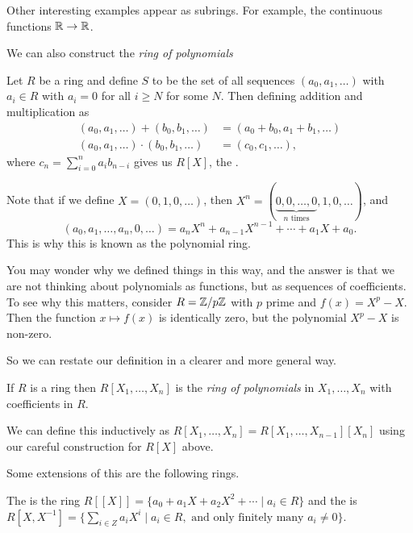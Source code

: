 \documentclass[a4paper]{scrartcl}
\begin{document}
 Other interesting examples appear as subrings. For example, the continuous functions $\mathbb{R} \rightarrow \mathbb{R}$.

 We can also construct the \emph{ring of polynomials} 

\begin{definition}
	Let $R$ be a ring and define $S$ to be  the set of all sequences $(a_0, a_1, \dots)$ with $a_i \in R$ with $a_i = 0$ for all $i \geq N$ for some $N$. Then defining addition and multiplication as
		 \begin{align*}
			 (a_0, a_1, \dots) + (b_0, b_1, \dots) &= (a_0 + b_0, a_1 + b_1, \dots) \\
			 (a_0, a_1, \dots) \cdot (b_0, b_1, \dots) &= (c_0, c_1, \dots),
		 \end{align*}
		 where $c_n = \sum_{i = 0}^n a_i b_{n - i}$ gives us $R[X]$, the .
\end{definition}

Note that if we define $X = (0, 1, 0, \dots)$, then $X^n = (\underbrace{0, 0, \dots, 0}_{\text{$n$ times}}, 1, 0, \dots)$, and
$$
(a_0, a_1, \dots, a_n, 0, \dots) = a_n X^n + a_{n - 1}X^{n - 1} + \cdots + a_1 X + a_0.
$$
This is why this is known as the polynomial ring.

You may wonder why we defined things in this way, and the answer is that we are not thinking about polynomials as functions, but as sequences of coefficients. To see why this matters, consider $R = \mathbb{Z}/p\mathbb{Z}$ with $p$ prime and $f(x) = X^p - X$. Then the function $x \mapsto f(x)$ is identically zero, but the polynomial $X^p - X$ is non-zero.

So we can restate our definition in a clearer and more general way.

\begin{definition}
	If $R$ is a ring then $R[X_1, \dots, X_n]$ is the \emph{ring of polynomials} in $X_1, \dots, X_n$ with coefficients in $R$.
\end{definition}

\begin{remark}
We can define this inductively as $R[X_1, \dots, X_n] = R[X_1, \dots, X_{n - 1}][X_n]$ using our careful construction for $R[X]$ above.
\end{remark}

Some extensions of this are the following rings.

\begin{definition}
	The  is the ring $R[[X]] = \{a_0 + a_1 X + a_2X^2 + \cdots \mid a_i \in R\}$ and the  is $R[X, X^{-1}] = \{\sum_{i \in Z}a_iX^{i} \mid a_i \in R, \text{ and only finitely many $a_i \neq 0$}\}$.
\end{definition}
\end{document}

